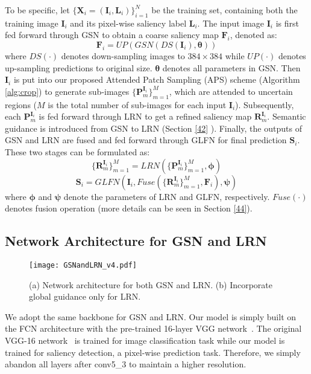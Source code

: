 \documentclass[10pt,twocolumn,letterpaper]{article}
\begin{document}
To be specific, let $\{\bm{X}_i = (\bm{I}_i, \bm{L}_i)\}_{i=1}^N$ be the training set, containing both the training image $\bm{I}_i$ and its pixel-wise saliency label $\bm{L}_i$. The input image $\bm{I}_i$ is first fed forward through GSN to obtain a coarse saliency map $\bm{F}_i$, denoted as:
\begin{equation}
\bm{F}_i = UP(GSN(DS(\bm{I}_i), \bm{\theta}))
\end{equation}
where $DS(\cdot)$ denotes down-sampling images to $384\times384$ while $UP(\cdot)$ denotes up-sampling predictions to original size. $\bm{\theta}$ denotes all parameters in GSN. Then $\bm{I}_i$ is put into our proposed Attended Patch Sampling (APS) scheme (Algorithm \ref{alg:crop}) to generate sub-images $\{\bm{P}_m^{\bm{I}_i}\}_{m=1}^M$, which are attended to uncertain regions ($M$ is the total number of sub-images for each input $\bm{I}_i$). Subsequently, each $\bm{P}_m^{\bm{I}_i}$ is fed forward through LRN to get a refined saliency map $\bm{R}_m^{\bm{I}_i}$. Semantic guidance is introduced from GSN to LRN (Section \ref{42} ). Finally, the outputs of GSN and LRN are fused and fed forward through GLFN for final prediction $\bm{S}_i$. These two stages can be formulated as:
\begin{equation}
\{\bm{R}_m^{\bm{I}_i}\}_{m=1}^M = LRN(\{\bm{P}_m^{\bm{I}_i}\}_{m=1}^M, \bm{\phi})
\end{equation}
\begin{equation}
\bm{S}_i = GLFN(\bm{I}_i, Fuse(\{\bm{R}_m^{\bm{I}_i}\}_{m=1}^M, \bm{F}_i), \bm{\psi})
\end{equation}
where $\bm{\phi}$ and $\bm{\psi}$ denote the parameters of LRN and GLFN, respectively. $Fuse(\cdot)$ denotes fusion operation (more details can be seen in Section \ref{44}).

\subsection{Network Architecture for GSN and LRN}
  \vspace{-2mm}
\begin{figure}[h]
  \centering
\texttt{[image: GSNandLRN\_v4.pdf]}\\
  \caption{(a) Network architecture for both GSN and LRN. (b) Incorporate global guidance only for LRN.}
  \label{gsnandlrn}
  \vspace{-2mm}
\end{figure}
We adopt the same backbone for GSN and LRN.
Our model is simply built on the FCN architecture with the pre-trained 16-layer VGG network~\cite{simonyan2014very}. The original VGG-16 network~\cite{simonyan2014very} is trained for image classification task while our model is trained for saliency detection, a pixel-wise prediction task. Therefore, we simply abandon all layers after conv5\_3 to maintain a higher resolution.
\end{document}

